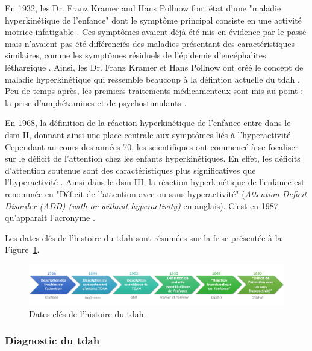 En 1932, les Dr. Franz Kramer and Hans Pollnow font état d'une "maladie hyperkinétique de l'enfance" dont le symptôme principal consiste en une 
activité motrice infatigable \citep{Kramer1932}. Ces symptômes avaient déjà été mis en évidence par le passé mais n'avaient pas été différenciés 
des maladies présentant des caractéristiques similaires, comme les symptômes résiduels de l'épidemie d'encéphalites léthargique \citep{Lange2010}. 
Ainsi, les Dr. Franz Kramer et Hans Pollnow ont créé le concept de maladie hyperkinétique qui ressemble beaucoup à la défintion actuelle
du \gls{tdah} \citep{Lange2010}. Peu de temps après, les premiers traitements médicamenteux sont mis au point : la prise d'amphétamines 
\citep{Bradley1937} et de psychostimulants \citep{Morton2000}. 

En 1968, la définition de la réaction hyperkinétique de l'enfance entre dans le \gls{dsm}-II, donnant ainsi une place centrale aux symptômes liés 
à l'hyperactivité. Cependant au cours des années 70, les scientifiques ont commencé à se focaliser sur le déficit de l'attention chez les enfants
hyperkinétiques. En effet, les déficits d'attention soutenue sont des caractéristiques plus significatives que l'hyperactivité 
\citep{Barkley2006, Douglas1972}. Ainsi dans le \gls{dsm}-III, la réaction hyperkinétique de l'enfance est renommée en "Déficit de l'attention 
avec ou sans hyperactivité" (\textit{Attention Deficit Disorder (ADD) (with or without hyperactivity)} en anglais). C'est en 1987 qu'apparait
l'acronyme  \citep{Lange2010}. 

Les dates clés de l'histoire du \gls{tdah} sont résumées sur la frise présentée à la Figure~\ref{Figure:introduction_adhd_history}.

\begin{figure}[h!]
  \centering
	\includegraphics[width=1\linewidth]{figures/chapter-1/introduction-adhd-history} 
  \caption{Dates clés de l'histoire du \gls{tdah}.}
  \label{Figure:introduction_adhd_history}
\end{figure}


\subsubsection{Diagnostic du \gls{tdah}}

